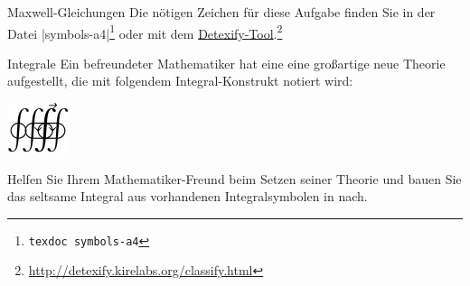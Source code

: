 \documentclass[
	vorläufig=true, 
	blattnr=2,
	ausgabe=2016-11-04,
	abgabe=2016-11-11,
	shortverb,
]{../tex/latexkurs-exercise}
\begin{document}
\begin{aufgabe}[6]{Maxwell-Gleichungen}
   Die nötigen Zeichen für diese Aufgabe finden Sie in der Datei |symbols-a4|\footnote{\texttt{texdoc symbols-a4}} oder mit dem \href{http://detexify.kirelabs.org/classify.html}{Detexify-Tool}.\footnote{\url{http://detexify.kirelabs.org/classify.html}}                                                              
                                                                                                                                                                                                                                                                                                                               
\end{aufgabe}


\begin{aufgabe}[3]{Integrale}
   Ein befreundeter Mathematiker hat eine eine großartige neue Theorie aufgestellt, die mit folgendem Integral-Konstrukt notiert wird:                                                                                                                                                                                    
   \begin{center}                                                                                                                                                                                                                                                                                                         
        \includegraphics{02_komischeintegrale} %
   \end{center}                                                                                                                                                                                                                                                                                                           
   Helfen Sie Ihrem Mathematiker-Freund beim Setzen seiner Theorie und bauen Sie das seltsame Integral aus vorhandenen Integralsymbolen in  nach.                                                                                                                                                        
   
\end{aufgabe}
\end{document}
